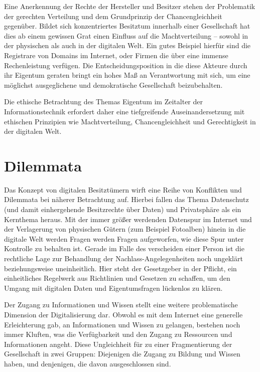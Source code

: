 \documentclass[journal]{IEEEtran}
\begin{document}
\begin{onecolumn}
Eine Anerkennung der Rechte der Hersteller und Besitzer stehen der Problematik der 
gerechten Verteilung und dem Grundprinzip der Chancengleichheit gegenüber. Bildet sich
konzentriertes Besitztum innerhalb einer Gesellschaft hat dies ab einem gewissen Grat
einen Einfluss auf die Machtverteilung – sowohl in der physischen als auch in der 
digitalen Welt. Ein gutes Beispiel hierfür sind die Registrare von Domains im Internet, 
oder Firmen die über eine immense Rechenleistung verfügen. Die Entscheidungsposition in
die diese Akteure durch ihr Eigentum geraten bringt ein hohes Maß an Verantwortung mit 
sich, um eine möglichst ausgeglichene und demokratische Gesellschaft beizubehalten.

Die ethische Betrachtung des Themas Eigentum im Zeitalter der Informationstechnik 
erfordert daher eine tiefgreifende Auseinandersetzung mit ethischen Prinzipien wie 
Machtverteilung, Chancengleichheit und Gerechtigkeit in der digitalen Welt.

\section{Dilemmata}

Das Konzept von digitalen Besitztümern wirft eine Reihe von Konflikten und Dilemmata bei 
näherer Betrachtung auf. Hierbei fallen das Thema Datenschutz (und damit einhergehende 
Besitzrechte über Daten) und Privatsphäre als ein Kernthema heraus. Mit der immer größer
werdenden Datenspur im Internet und der Verlagerung von physischen Gütern (zum Beispiel 
Fotoalben) hinein in die digitale Welt werden Fragen werden Fragen aufgeworfen, wie diese
Spur unter Kontrolle zu behalten ist. Gerade im Falle des verscheiden einer Person ist die 
rechtliche Lage zur Behandlung der Nachlass-Angelegenheiten noch ungeklärt beziehungsweise
uneinheitlich. \cite{law-journal} Hier steht der Gesetzgeber in der Pflicht, ein 
einheitliches Regelwerk aus Richtlinien und Gesetzen zu schaffen, um den Umgang mit 
digitalen Daten und Eigentumsfragen lückenlos zu klären.

Der Zugang zu Informationen und Wissen stellt eine weitere problematische Dimension der
Digitalisierung dar. Obwohl es mit dem Internet eine generelle Erleichterung gab, an 
Informationen und Wissen zu gelangen, bestehen noch immer Kluften, was die Verfügbarkeit 
und den Zugang zu Ressourcen und Informationen angeht. Diese Ungleichheit für zu einer 
Fragmentierung der Gesellschaft in zwei Gruppen: Diejenigen die Zugang zu Bildung und 
Wissen haben, und denjenigen, die davon ausgeschlossen sind.


\end{onecolumn}
\end{document}

